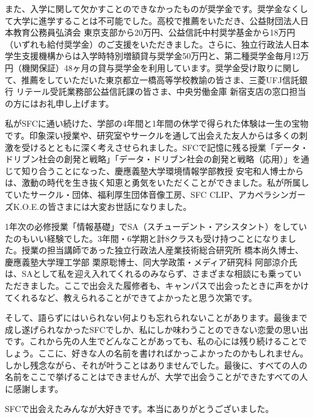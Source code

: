 \begin{acknowledgment}
  また、入学に関して欠かすことのできなかったものが奨学金です。奨学金なくして大学に進学することは不可能でした。高校で推薦をいただき、公益財団法人日本教育公務員弘済会 東京支部から20万円、公益信託中村奨学基金から18万円（いずれも給付奨学金）のご支援をいただきました。さらに、独立行政法人日本学生支援機構からは入学時特別増額貸与奨学金50万円と、第二種奨学金毎月12万円（機関保証）48ヶ月の貸与奨学金を利用しています。奨学金受け取りに関して、推薦をしていただいた東京都立一橋高等学校教諭の皆さま、三菱UFJ信託銀行 リテール受託業務部公益信託課の皆さま、中央労働金庫 新宿支店の窓口担当の方にはお礼申し上げます。

  私がSFCに通い続けた、学部の4年間と1年間の休学で得られた体験は一生の宝物です。印象深い授業や、研究室やサークルを通して出会えた友人からは多くの刺激を受けるとともに深く考えさせられました。SFCで記憶に残る授業「データ・ドリブン社会の創発と戦略」「データ・ドリブン社会の創発と戦略（応用）」を通じて知り合うことになった、慶應義塾大学環境情報学部教授 安宅和人博士からは、激動の時代を生き抜く知恵と勇気をいただくことができました。私が所属していたサークル・団体、福利厚生団体音像工房、SFC CLIP、アカペラシンガーズK.O.E.の皆さまには大変お世話になりました。

  1年次の必修授業「情報基礎」でSA（スチューデント・アシスタント）をしていたのもいい経験でした。3年間・6学期と計8クラスも受け持つことになりました。授業の担当講師であった独立行政法人産業技術総合研究所 橋本尚久博士、慶應義塾大学理工学部 栗原聡博士、同大学政策・メディア研究科 阿部涼介氏は、SAとして私を迎え入れてくれるのみならず、さまざまな相談にも乗っていただきました。ここで出会えた履修者も、キャンパスで出会ったときに声をかけてくれるなど、教えられることができてよかったと思う次第です。

  そして、語らずにはいられない何よりも忘れられないことがあります。最後まで成し遂げられなかったSFCでしか、私にしか味わうことのできない恋愛の思い出です。これから先の人生でどんなことがあっても、私の心には残り続けることでしょう。ここに、好きな人の名前を書ければかっこよかったのかもしれません。しかし残念ながら、それが叶うことはありませんでした。最後に、すべての人の名前をここで挙げることはできませんが、大学で出会うことができたすべての人に感謝します。

  SFCで出会えたみんなが大好きです。本当にありがとうございました。

\end{acknowledgment}
